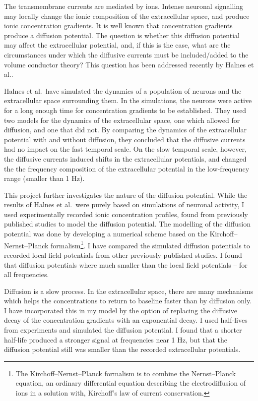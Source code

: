 \documentclass{article}
\begin{document}
The transmembrane currents are mediated by ions. Intense neuronal signalling may locally change the ionic composition of the extracellular space, and produce ionic concentration gradients. It is well known that concentration gradients produce a diffusion potential. The question is whether this diffusion potential may affect the extracellular potential, and, if this is the case, what are the circumstances under which the diffusive currents must be included/added to the volume conductor theory? This question has been addressed recently by Halnes et al.\cite{Halnes2016}. 

Halnes et al.\ have simulated the dynamics of a population of neurons and the extracellular space surrounding them. In the simulations, the neurons were active for a long enough time for concentration gradients to be established. They used two models for the dynamics of the extracellular space, one which allowed for diffusion, and one that did not. By comparing the dynamics of the extracellular potential with and without diffusion, they concluded that the diffusive currents had no impact on the fast temporal scale. On the slow temporal scale, however, the diffusive currents induced shifts in the extracellular potentials, and changed the the frequency composition of the extracellular potential in the low-frequency range (smaller than 1 Hz).


This project further investigates the nature of the diffusion potential. While the results of Halnes et al.\ were purely based on simulations of neuronal activity, I used experimentally recorded ionic concentration profiles, found from previously published studies to model the diffusion potential. The modelling of the diffusion potential was done by developing a numerical scheme based on the Kirchoff--Nernst--Planck formalism\footnote{The Kirchoff--Nernst--Planck formalism is to combine the Nernst--Planck equation, an ordinary differential equation describing the electrodiffusion of ions in a solution with, Kirchoff's law of current conservation.}.  I have compared the simulated diffusion potentials to recorded local field potentials from other previously published studies. I found that diffusion potentials where much smaller than the local field potentials -- for all frequencies. 

Diffusion is a slow process. In the extracellular space, there are many mechanisms which helps the concentrations to return to baseline faster than by diffusion only. I have incorporated this in my model by the option of replacing the diffusive decay of the concentration gradients with an exponential decay. I used half-lives from experiments and simulated the diffusion potential. I found that a shorter half-life produced a stronger signal at frequencies near 1 Hz, but that the diffusion potential still was smaller than the recorded extracellular potentials. 
\end{document}
